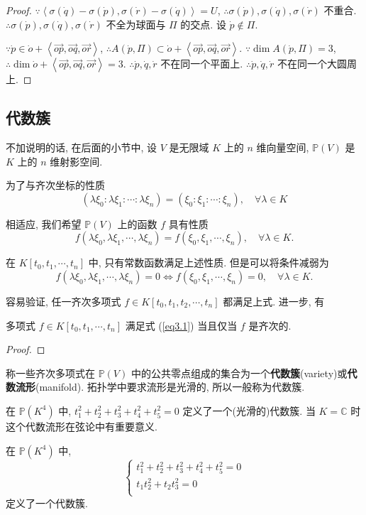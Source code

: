 \documentclass[color=black,device=normal,lang=cn,mode=geye]{elegantnote}
\begin{document}
\begin{proof}
    $\because\left<\sigma(\dot{q})-\sigma(\dot{p}),\sigma(\dot{r})-\sigma(\dot{q})\right>=U$, $\therefore\sigma(\dot{p}),\sigma(\dot{q}),\sigma(\dot{r})$ 不重合. $\therefore\sigma(\dot{p}),\sigma(\dot{q}),\sigma(\dot{r})$ 不全为球面与 $\varPi$ 的交点. 设 $\dot{p}\notin\varPi$.
    
    $\because\dot{p}\in\dot{o}+\left<\overrightarrow{op},\overrightarrow{oq},\overrightarrow{or}\right>$, $\therefore A(\dot{p},\varPi)\subset\dot{o}+\left<\overrightarrow{op},\overrightarrow{oq},\overrightarrow{or}\right>$. $\because\dim A(\dot{p},\varPi)=3$, $\therefore\dim\dot{o}+\left<\overrightarrow{op},\overrightarrow{oq},\overrightarrow{or}\right>=3$. $\therefore\dot{p},\dot{q},\dot{r}$ 不在同一个平面上. $\therefore\dot{p},\dot{q},\dot{r}$ 不在同一个大圆周上.
\end{proof}
\subsection{代数簇}
不加说明的话, 在后面的小节中, 设 $V$ 是无限域 $K$ 上的 $n$ 维向量空间, $\mathbb{P}(V)$ 是 $K$ 上的 $n$ 维射影空间.

为了与齐次坐标的性质
\[(\lambda\xi_0:\lambda\xi_1:\cdots:\lambda\xi_n)=(\xi_0:\xi_1:\cdots:\xi_n),\quad\forall\lambda\in K\]

相适应, 我们希望 $\mathbb{P}(V)$ 上的函数 $f$ 具有性质
\[f(\lambda\xi_0,\lambda\xi_1,\cdots,\lambda\xi_n)=f(\xi_0,\xi_1,\cdots,\xi_n),\quad\forall\lambda\in K.\]

在 $K[t_0,t_1,\cdots,t_n]$ 中, 只有常数函数满足上述性质. 但是可以将条件减弱为
\begin{equation}\label{eq3.1}
    f(\lambda\xi_0,\lambda\xi_1,\cdots,\lambda\xi_n)=0\Leftrightarrow f(\xi_0,\xi_1,\cdots,\xi_n)=0,\quad\forall\lambda\in K.
\end{equation}

容易验证, 任一齐次多项式 $f\in K[t_0,t_1,t_2,\cdots,t_n]$ 都满足上式. 进一步, 有
\begin{theorem}
    多项式 $f\in K[t_0,t_1,\cdots,t_n]$ 满足式 (\ref{eq3.1}) 当且仅当 $f$ 是齐次的.
\end{theorem}
\begin{proof}
    
\end{proof}
\begin{definition}
    称一些齐次多项式在 $\mathbb{P}(V)$ 中的公共零点组成的集合为一个\textbf{代数簇}(variety)或\textbf{代数流形}(manifold). 拓扑学中要求流形是光滑的, 所以一般称为代数簇.
\end{definition}
\begin{example}
    在 $\mathbb{P}(K^4)$ 中, $t_1^2+t_2^2+t_3^2+t_4^2+t_5^2=0$ 定义了一个(光滑的)代数簇. 当 $K=\mathbb{C}$ 时这个代数流形在弦论中有重要意义.
\end{example}
\begin{example}
    在 $\mathbb{P}(K^4)$ 中,
    \[\begin{cases}
        t_1^2+t_2^2+t_3^2+t_4^2+t_5^2=0 \\
        t_1t_2^2+t_2t_3^2=0 \\
    \end{cases}\]
    定义了一个代数簇.
\end{example}
\end{document}
